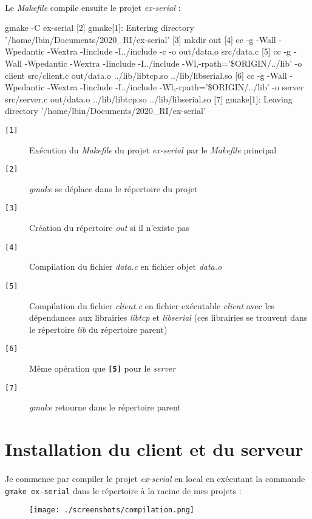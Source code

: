 \documentclass{article}
\begin{document}
    \paragraph{}
    Le \emph{Makefile} compile ensuite le projet \emph{ex-serial} :
    \begin{verbatimtab}
[1]         gmake -C ex-serial
[2]         gmake[1]: Entering directory '/home/lbin/Documents/2020_RI/ex-serial'
[3]         mkdir out
[4]         cc -g  -Wall -Wpedantic -Wextra -Iinclude -I../include
                -c -o out/data.o src/data.c
[5]         cc -g  -Wall -Wpedantic -Wextra -Iinclude -I../include
                -Wl,-rpath='\$ORIGIN/../lib' -o client src/client.c
                out/data.o ../lib/libtcp.so ../lib/libserial.so
[6]         cc -g  -Wall -Wpedantic -Wextra -Iinclude -I../include
                -Wl,-rpath='\$ORIGIN/../lib' -o server src/server.c
                out/data.o ../lib/libtcp.so ../lib/libserial.so
[7]         gmake[1]: Leaving directory '/home/lbin/Documents/2020_RI/ex-serial'
    \end{verbatimtab}

    \begin{description}
        \item[\texttt{[1]} ] Exécution du \emph{Makefile} du projet \emph{ex-serial} par le \emph{Makefile} principal
        \item[\texttt{[2]} ] \emph{gmake} se déplace dans le répertoire du projet
        \item[\texttt{[3]} ] Création du répertoire \emph{out} si il n'existe pas
        \item[\texttt{[4]} ] Compilation du fichier \emph{data.c} en fichier objet \emph{data.o}
        \item[\texttt{[5]} ] Compilation du fichier \emph{client.c} en fichier exécutable \emph{client} avec les dépendances aux librairies \emph{libtcp} et \emph{libserial} (ces librairies se trouvent dans le répertoire \emph{lib} du répertoire parent)
        \item[\texttt{[6]} ] Même opération que \textbf{\texttt{[5]}} pour le \emph{server}
        \item[\texttt{[7]} ] \emph{gmake} retourne dans le répertoire parent
    \end{description}


    \section{Installation du client et du serveur}
    \paragraph{}
    Je commence par compiler le projet \emph{ex-serial} en local en exécutant la commande \texttt{gmake ex-serial} dans le répertoire à la racine de mes projets :
    \begin{figure}[H]
        \centering
        \texttt{[image: ./screenshots/compilation.png]}
    \end{figure}
\end{document}
